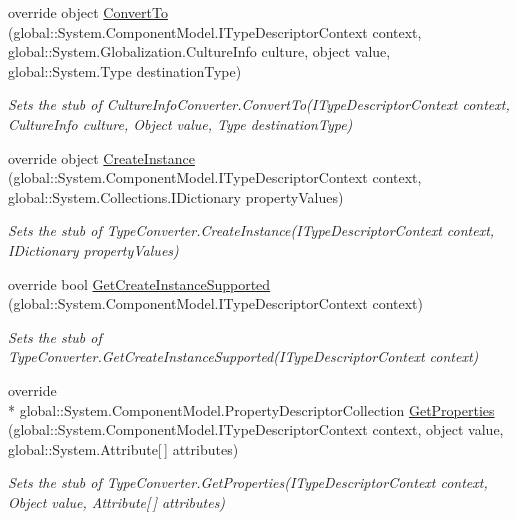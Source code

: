 \begin{DoxyCompactItemize}
override object \hyperlink{class_system_1_1_component_model_1_1_fakes_1_1_stub_culture_info_converter_a23e40281ecf627a19d89a8f5fa2ab6ad}{Convert\-To} (global\-::\-System.\-Component\-Model.\-I\-Type\-Descriptor\-Context context, global\-::\-System.\-Globalization.\-Culture\-Info culture, object value, global\-::\-System.\-Type destination\-Type)
\begin{DoxyCompactList}\small\item\em Sets the stub of Culture\-Info\-Converter.\-Convert\-To(\-I\-Type\-Descriptor\-Context context, Culture\-Info culture, Object value, Type destination\-Type)\end{DoxyCompactList}\item 
override object \hyperlink{class_system_1_1_component_model_1_1_fakes_1_1_stub_culture_info_converter_a42da2d22ff993685bf080092dfcbff1b}{Create\-Instance} (global\-::\-System.\-Component\-Model.\-I\-Type\-Descriptor\-Context context, global\-::\-System.\-Collections.\-I\-Dictionary property\-Values)
\begin{DoxyCompactList}\small\item\em Sets the stub of Type\-Converter.\-Create\-Instance(\-I\-Type\-Descriptor\-Context context, I\-Dictionary property\-Values)\end{DoxyCompactList}\item 
override bool \hyperlink{class_system_1_1_component_model_1_1_fakes_1_1_stub_culture_info_converter_a8969d7285471df836d7e7a51b907eb51}{Get\-Create\-Instance\-Supported} (global\-::\-System.\-Component\-Model.\-I\-Type\-Descriptor\-Context context)
\begin{DoxyCompactList}\small\item\em Sets the stub of Type\-Converter.\-Get\-Create\-Instance\-Supported(\-I\-Type\-Descriptor\-Context context)\end{DoxyCompactList}\item 
override \\*
global\-::\-System.\-Component\-Model.\-Property\-Descriptor\-Collection \hyperlink{class_system_1_1_component_model_1_1_fakes_1_1_stub_culture_info_converter_a18500fe409cf81205ad7e84316443a73}{Get\-Properties} (global\-::\-System.\-Component\-Model.\-I\-Type\-Descriptor\-Context context, object value, global\-::\-System.\-Attribute\mbox{[}$\,$\mbox{]} attributes)
\begin{DoxyCompactList}\small\item\em Sets the stub of Type\-Converter.\-Get\-Properties(\-I\-Type\-Descriptor\-Context context, Object value, Attribute\mbox{[}$\,$\mbox{]} attributes)\end{DoxyCompactList}\item 

\end{DoxyCompactItemize}
